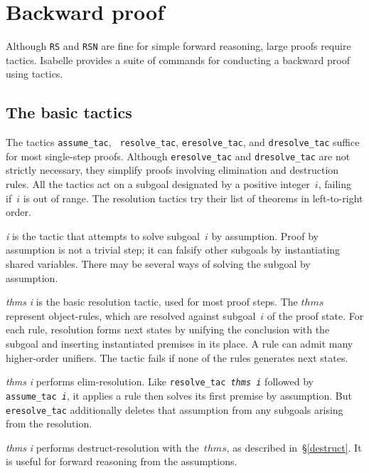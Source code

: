 \section{Backward proof}
Although \texttt{RS} and \texttt{RSN} are fine for simple forward reasoning,
large proofs require tactics.  Isabelle provides a suite of commands for
conducting a backward proof using tactics.

\subsection{The basic tactics}
The tactics \texttt{assume_tac}, {\tt
resolve_tac}, \texttt{eresolve_tac}, and \texttt{dresolve_tac} suffice for most
single-step proofs.  Although \texttt{eresolve_tac} and \texttt{dresolve_tac} are
not strictly necessary, they simplify proofs involving elimination and
destruction rules.  All the tactics act on a subgoal designated by a
positive integer~$i$, failing if~$i$ is out of range.  The resolution
tactics try their list of theorems in left-to-right order.

\begin{ttdescription}
\item[\ttindex{assume_tac} {\it i}] 
  is the tactic that attempts to solve subgoal~$i$ by assumption.  Proof by
  assumption is not a trivial step; it can falsify other subgoals by
  instantiating shared variables.  There may be several ways of solving the
  subgoal by assumption.

\item[\ttindex{resolve_tac} {\it thms} {\it i}]
  is the basic resolution tactic, used for most proof steps.  The $thms$
  represent object-rules, which are resolved against subgoal~$i$ of the
  proof state.  For each rule, resolution forms next states by unifying the
  conclusion with the subgoal and inserting instantiated premises in its
  place.  A rule can admit many higher-order unifiers.  The tactic fails if
  none of the rules generates next states.

\item[\ttindex{eresolve_tac} {\it thms} {\it i}] 
  performs elim-resolution.  Like \texttt{resolve_tac~{\it thms}~{\it i\/}}
  followed by \texttt{assume_tac~{\it i}}, it applies a rule then solves its
  first premise by assumption.  But \texttt{eresolve_tac} additionally deletes
  that assumption from any subgoals arising from the resolution.

\item[\ttindex{dresolve_tac} {\it thms} {\it i}]
  performs destruct-resolution with the~$thms$, as described
  in~\S\ref{destruct}.  It is useful for forward reasoning from the
  assumptions.
\end{ttdescription}

